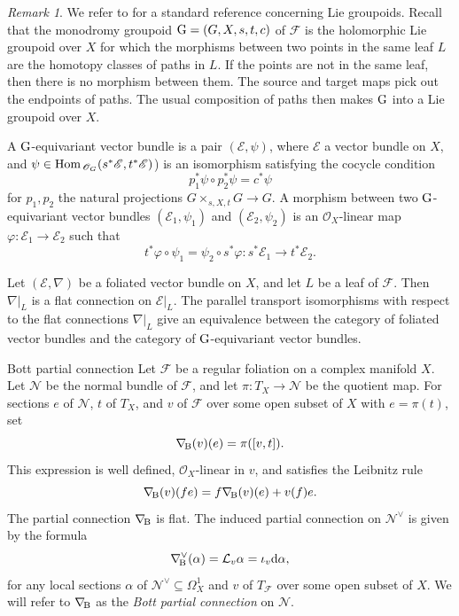\documentclass[english,10pt]{amsart}
\makeatletter
\renewcommand\subsection{\@startsection{subsection}{2}%
  \z@{.5\linespacing\@plus.7\linespacing}{-.5em}%
  {\normalfont\sffamily}}
\newcommand{\nablaBott}{\nabla_{\! \textup{B}}}
\renewcommand{\phi}{\varphi}
\newcommand{\cF}{\mathcal{F}}
\newcommand{\cL}{\mathcal{L}}
\newcommand{\sE}{\mathscr{E}}
\newcommand{\sN}{\mathscr{N}}
\newcommand{\sO}{\mathscr{O}}
\newcommand{\dd}{\textup{d}}
\theoremstyle{definition}
\theoremstyle{remark}
\newtheorem{rem}[thm]{Remark}
\numberwithin{equation}{section}
\makeatother
\begin{document}
\begin{rem}
We refer to \cite{moerdijk_mrcun_foliations} for a standard reference concerning Lie groupoids.
Recall that the monodromy groupoid $\textup{G}=(G,X,s,t,c)$ of $\cF$ is the holomorphic Lie groupoid over $X$ for which the morphisms between two points in the same leaf $L$ are the homotopy classes of paths in $L$. If the points are not in the same leaf, then there is no morphism between them. The source and target maps pick out the endpoints of paths. The usual composition of paths then makes $\textup{G}$ into a Lie groupoid over $X$. 

A $\textup{G}$-equivariant vector bundle is a pair $(\sE,\psi)$, where $\sE$ a vector bundle on $X$, and $\psi\in \textup{Hom}_{\,\sO_G}(s^*\sE,t^*\sE)$) is an isomorphism satisfying the cocycle condition
\[
p_1^*\psi \circ p_2^* \psi = c^* \psi
\]
for $p_1,p_2$ the natural projections $G\times_{s,X,t} G \to G$.
A morphism between two $\textup{G}$-equivariant vector bundles $(\sE_1,\psi_1)$ and $(\sE_2,\psi_2)$ is an $\sO_X$-linear map $\phi \colon \sE_1 \to \sE_2$ such that 
\[
t^*\phi \circ \psi_1 = \psi_2 \circ s^*\phi\colon s^*\sE_1 \to t^*\sE_2.
\]

Let $(\sE,\nabla)$ be a foliated vector bundle on $X$, and let $L$ be a leaf of $\cF$. Then $\nabla|_L$ is a flat connection on $\sE|_L$. The parallel transport isomorphisms with respect to the flat connections $\nabla|_L$ give an equivalence between the category of foliated vector bundles and the category of $\textup{G}$-equivariant vector bundles. 
\end{rem}

\subsection{Bott partial connection}\label{exmp:bott_connection} 
Let $\cF$ be a regular foliation on a complex manifold $X$. Let $\sN$ be the normal bundle of $\cF$, and let $\pi\colon T_X\to \sN$ be the quotient map. For sections $e$ of $\sN$, $t$ of $T_X$, and $v$ of $\cF$ over some open subset of $X$ with $e=\pi(t)$, set 
\[
\nablaBott(v)(e)=\pi ([v,t]). 
\]
This expression is well defined, $\sO_X$-linear in $v$, and satisfies the Leibnitz rule 
\[\nablaBott(v)(fe)=f\nablaBott(v)(e)+v(f)e.
\]
The partial connection $\nablaBott$ is flat. The induced partial connection on $\sN^\vee$ is given by the formula
\[
\nablaBott^\vee(\alpha)=\cL_v \alpha =\iota_v \dd \alpha,
\]
for any local sections $\alpha$ of $\sN^\vee \subseteq \Omega_X^1$ and $v$ of $T_\cF$ over some open subset of $X$.
We will refer to $\nablaBott$ as the \textit{Bott partial connection} on $\sN$.
\end{document}
